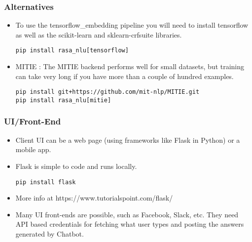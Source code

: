  \begin{frame}[fragile]\frametitle{Alternatives}
\begin{itemize}
\item To use the tensorflow\_embedding pipeline you will need to install tensorflow as well as the scikit-learn and sklearn-crfsuite libraries. 
\begin{lstlisting}
pip install rasa_nlu[tensorflow]
\end{lstlisting}
\item MITIE : The MITIE backend performs well for small datasets, but training can take very long if you have more than a couple of hundred examples.
\begin{lstlisting}
pip install git+https://github.com/mit-nlp/MITIE.git
pip install rasa_nlu[mitie]
\end{lstlisting}
\end{itemize}

\end{frame}




 \begin{frame}[fragile]\frametitle{UI/Front-End}
\begin{itemize}
\item Client UI can be a web page (using frameworks like Flask in Python) or a mobile app. 
\item Flask is simple to code and runs locally. 
\begin{lstlisting}
pip install flask
\end{lstlisting}
\item More info at https://www.tutorialspoint.com/flask/
\item Many UI front-ends are possible, such as Facebook, Slack, etc. They need API based credentials for fetching what user types and posting the answers generated by Chatbot.
\end{itemize}

\end{frame}